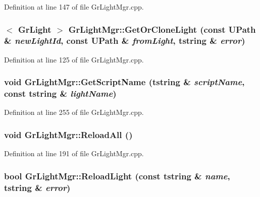 Definition at line 147 of file GrLightMgr.cpp.\hypertarget{class_gr_light_mgr_5ea84c63918a70154432b723c9b8cf15}{
\subsubsection[{GetOrCloneLight}]{$<$ {\bf GrLight} $>$ GrLightMgr::GetOrCloneLight (const {\bf UPath} \& {\em newLightId}, \/  const {\bf UPath} \& {\em fromLight}, \/  {\bf tstring} \& {\em error})}}
\label{class_gr_light_mgr_5ea84c63918a70154432b723c9b8cf15}




Definition at line 125 of file GrLightMgr.cpp.\hypertarget{class_gr_light_mgr_0562b96df126321d6d85efffcda2d054}{
\subsubsection[{GetScriptName}]{\setlength{\rightskip}{0pt plus 5cm}void GrLightMgr::GetScriptName ({\bf tstring} \& {\em scriptName}, \/  const {\bf tstring} \& {\em lightName})}}
\label{class_gr_light_mgr_0562b96df126321d6d85efffcda2d054}




Definition at line 255 of file GrLightMgr.cpp.\hypertarget{class_gr_light_mgr_13f7ffc5a5cd10224fc254559d67e9c9}{
\subsubsection[{ReloadAll}]{\setlength{\rightskip}{0pt plus 5cm}void GrLightMgr::ReloadAll ()}}
\label{class_gr_light_mgr_13f7ffc5a5cd10224fc254559d67e9c9}




Definition at line 191 of file GrLightMgr.cpp.\hypertarget{class_gr_light_mgr_b3e17843ed610744b41e0687fd69e39e}{
\subsubsection[{ReloadLight}]{\setlength{\rightskip}{0pt plus 5cm}bool GrLightMgr::ReloadLight (const {\bf tstring} \& {\em name}, \/  {\bf tstring} \& {\em error})}}
\label{class_gr_light_mgr_b3e17843ed610744b41e0687fd69e39e}




